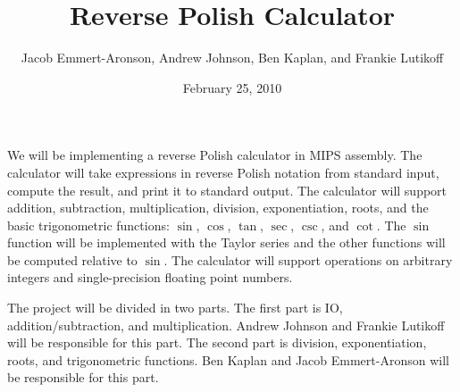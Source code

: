 \documentclass[11pt,letterpaper]{article}
\title{Reverse Polish Calculator}
\author{Jacob Emmert-Aronson, Andrew Johnson, Ben Kaplan, and Frankie Lutikoff}
\date{February 25, 2010}
\begin{document}
\maketitle
We will be implementing a reverse Polish calculator in MIPS assembly.
The calculator will take expressions in reverse Polish notation from
standard input, compute the result, and print it to standard output.
The calculator will support addition, subtraction, multiplication,
division, exponentiation, roots, and the basic trigonometric
functions: $\sin$, $\cos$, $\tan$, $\sec$, $\csc$, and $\cot$.  The
$\sin$ function will be implemented with the Taylor series and the
other functions will be computed relative to $\sin$.  The calculator
will support operations on arbitrary integers and single-precision
floating point numbers.

The project will be divided in two parts.  The first part is IO,
addition/subtraction, and multiplication.  Andrew Johnson and Frankie
Lutikoff will be responsible for this part.  The second part is
division, exponentiation, roots, and trigonometric functions.  Ben
Kaplan and Jacob Emmert-Aronson will be responsible for this part.
\end{document}
